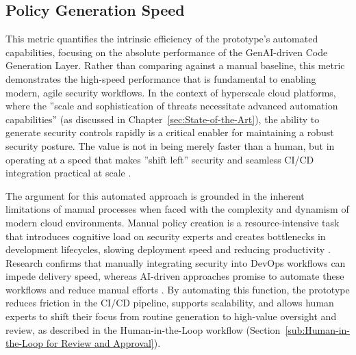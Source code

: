 
\subsection{Policy Generation Speed}
\label{sec:policy-generation-speed}

This metric quantifies the intrinsic efficiency of the prototype's automated capabilities, focusing on the absolute performance of the GenAI-driven Code Generation Layer. Rather than comparing against a manual baseline, this metric demonstrates the high-speed performance that is fundamental to enabling modern, agile security workflows. In the context of hyperscale cloud platforms, where the ''scale and sophistication of threats necessitate advanced automation capabilities'' (as discussed in Chapter~\ref{sec:State-of-the-Art}), the ability to generate security controls rapidly is a critical enabler for maintaining a robust security posture. The value is not in being merely faster than a human, but in operating at a speed that makes ''shift left'' security and seamless CI/CD integration practical at scale \cite{fu_ai_2025}.

The argument for this automated approach is grounded in the inherent limitations of manual processes when faced with the complexity and dynamism of modern cloud environments. Manual policy creation is a resource-intensive task that introduces cognitive load on security experts and creates bottlenecks in development lifecycles, slowing deployment speed and reducing productivity \cite{gunathilaka_context-aware_2025-1, mahboob_future_2024}. Research confirms that manually integrating security into DevOps workflows can impede delivery speed, whereas AI-driven approaches promise to automate these workflows and reduce manual efforts \cite{fu_ai_2025}. By automating this function, the prototype reduces friction in the CI/CD pipeline, supports scalability, and allows human experts to shift their focus from routine generation to high-value oversight and review, as described in the Human-in-the-Loop workflow (Section~\ref{sub:Human-in-the-Loop for Review and Approval}).

